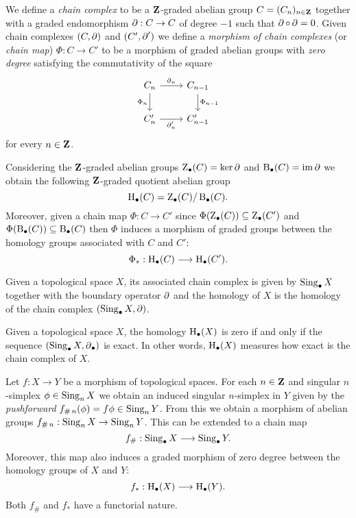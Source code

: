 \begin{definition}
\label{def:chain-complex}
We define a \emph{chain complex} to be a \(\mathbf{Z}\)-graded abelian group
\(C = (C_n)_{n \in \mathbf{Z}}\) together with a graded endomorphism \(\operatorname{\partial}: C \to C\)
of degree \(-1\) such that \(\operatorname{\partial} \circ \operatorname{\partial} = 0\). Given chain complexes
\((C, \operatorname{\partial})\) and \((C', \operatorname{\partial}')\) we define a \emph{morphism of chain
  complexes} (or \emph{chain map}) \(\Phi: C \to C'\) to be a morphism of graded
abelian groups with \emph{zero degree} satisfying the commutativity of the
square
\[
\begin{tikzcd}
C_n \ar[d, "\Phi_n"'] \ar[r, "\face_n"] &C_{n-1} \ar[d, "\Phi_{n-1}"] \\
C_n' \ar[r, "\face_n'"'] &C_{n-1}'
\end{tikzcd}
\]
for every \(n \in \mathbf{Z}\).

Considering the \(\mathbf{Z}\)-graded abelian groups \(\operatorname{Z}_{\bullet}(C) = \ker
\operatorname{\partial}\) and \(\operatorname{B}_{\bullet}(C) = \operatorname{im} \operatorname{\partial}\) we obtain the following
\(\mathbf{Z}\)-graded quotient abelian group
\[
\operatorname{H}_{\bullet}(C) = \operatorname{Z}_{\bullet}(C)/\operatorname{B}_{\bullet}(C).
\]
Moreover, given a chain map \(\Phi: C \to C'\) since
\(\Phi(\operatorname{Z}_{\bullet}(C)) \subseteq \operatorname{Z}_{\bullet}(C')\) and
\(\Phi(\operatorname{B}_{\bullet}(C)) \subseteq \operatorname{B}_{\bullet}(C)\) then \(\Phi\) induces
a morphism of graded groups between the homology groups associated with \(C\)
and \(C'\):
\[
\Phi_{*}: \operatorname{H}_{\bullet}(C) \longrightarrow \operatorname{H}_{\bullet}(C').
\]

Given a topological space \(X\), its associated chain complex is given by
\(\operatorname{Sing}_{\bullet} X\) together with the boundary operator \(\operatorname{\partial}\) and the
homology of \(X\) is the homology of the chain complex \((\operatorname{Sing}_{\bullet} X, \operatorname{\partial})\).
\end{definition}

\begin{corollary}
\label{cor:homology-zero-iff-seq-is-exact}
Given a topological space \(X\), the homology \(\operatorname{H}_{\bullet}(X)\) is zero if
and only if the sequence \((\operatorname{Sing}_{\bullet} X, \operatorname{\partial}_{\bullet})\) is
exact. In other words, \(\operatorname{H}_{\bullet}(X)\) measures how exact is the chain
complex of \(X\).
\end{corollary}

\begin{proposition}
\label{prop:induced-chain-map-and-homology-map}
Let \(f: X \to Y\) be a morphism of topological spaces. For each \(n \in \mathbf{Z}\)
and singular \(n\)-simplex \(\phi \in \operatorname{Sing}_n X\) we obtain an induced singular
\(n\)-simplex in \(Y\) given by the \emph{pushforward}
\(f_{\#\, n}(\phi) = f \phi \in \operatorname{Sing}_n Y\). From this we obtain a morphism of
abelian groups \(f_{\#\, n}: \operatorname{Sing}_n X \to \operatorname{Sing}_n Y\). This can be extended to
a chain map
\[
f_{\#}: \operatorname{Sing}_{\bullet} X \longrightarrow \operatorname{Sing}_{\bullet} Y.
\]
Moreover, this map also induces a graded morphism of zero degree between the
homology groups of \(X\) and \(Y\):
\[
f_{*}: \operatorname{H}_{\bullet}(X) \longrightarrow \operatorname{H}_{\bullet}(Y).
\]
Both \(f_{\#}\) and \(f_{*}\) have a functorial nature.
\end{proposition}

